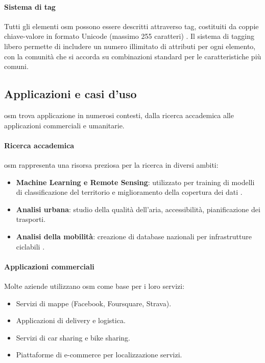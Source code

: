 \paragraph{Sistema di tag}
Tutti gli elementi \acrshort{osm} possono essere descritti attraverso tag, costituiti da coppie chiave-valore
in formato Unicode (massimo 255 caratteri) \cite{mapfeatures2024}. Il sistema di tagging libero permette di includere
un numero illimitato di attributi per ogni elemento, con la comunità che si accorda su combinazioni standard
per le caratteristiche più comuni.

\subsection{Applicazioni e casi d'uso}

\acrfull{osm} trova applicazione in numerosi contesti, dalla ricerca accademica alle applicazioni commerciali e
umanitarie.

\paragraph{Ricerca accademica}
\acrfull{osm} rappresenta una risorsa preziosa per la ricerca in diversi ambiti:
\begin{itemize}
  \item \textbf{Machine Learning e Remote Sensing}: utilizzato per training di modelli di classificazione del territorio
        e miglioramento della copertura dei dati \cite{vargas2020}.
  \item \textbf{Analisi urbana}: studio della qualità dell'aria, accessibilità, pianificazione dei trasporti.
  \item \textbf{Analisi della mobilità}: creazione di database nazionali per infrastrutture ciclabili \cite{sfu2022}.
\end{itemize}

\paragraph{Applicazioni commerciali}
Molte aziende utilizzano \acrfull{osm} come base per i loro servizi:
\begin{itemize}
  \item Servizi di mappe (Facebook, Foursquare, Strava).
  \item Applicazioni di delivery e logistica.
  \item Servizi di car sharing e bike sharing.
  \item Piattaforme di e-commerce per localizzazione servizi.
\end{itemize}

